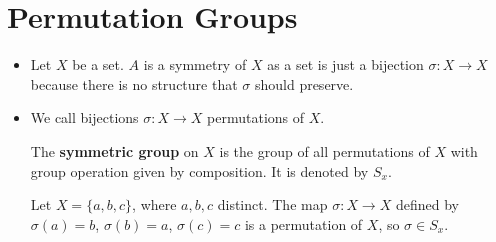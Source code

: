 \section{Permutation Groups}
\begin{itemize}
    \item Let $X$ be a set. $A$ is a symmetry of $X$ as a set is just a bijection $\sigma: X\to X$ because there is no structure that $\sigma$ should preserve.
    \item We call bijections $\sigma: X \to X$ permutations of $X$.
    \begin{definition}
        The \textbf{symmetric group} on $X$ is the group of all permutations of $X$ with group operation given by composition. It is denoted by $S_x$.
    \end{definition}
    \begin{example}
        Let $X=\{a,b,c\}$, where $a,b,c$ distinct. The map $\sigma: X\to X$ defined by $\sigma(a)=b$, $\sigma(b)=a$, $\sigma(c)=c$ is a permutation of $X$, so $\sigma \in S_x$.


\end{example}
\end{itemize}
